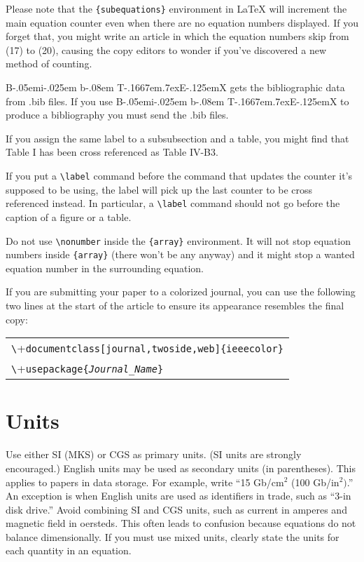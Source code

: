 \documentclass[journal,twoside,web]{ieeecolor}
\def\BibTeX{{\rm B\kern-.05em{\sc i\kern-.025em b}\kern-.08em
    T\kern-.1667em\lower.7ex\hbox{E}\kern-.125emX}}
\begin{document}
Please note that the \verb|{subequations}| environment in {\LaTeX}
will increment the main equation counter even when there are no
equation numbers displayed. If you forget that, you might write an
article in which the equation numbers skip from (17) to (20), causing
the copy editors to wonder if you've discovered a new method of
counting.

{\BibTeX} gets the bibliographic
data from .bib files. If you use {\BibTeX} to produce a
bibliography you must send the .bib files. 

If you assign the same label to a
subsubsection and a table, you might find that Table I has been cross
referenced as Table IV-B3. 

If you put a
\verb|\label| command before the command that updates the counter it's
supposed to be using, the label will pick up the last counter to be
cross referenced instead. In particular, a \verb|\label| command
should not go before the caption of a figure or a table.

Do not use \verb|\nonumber| inside the \verb|{array}| environment. It
will not stop equation numbers inside \verb|{array}| (there won't be
any anyway) and it might stop a wanted equation number in the
surrounding equation.

If you are submitting your paper to a colorized journal, you can use
the following two lines at the start of the article to ensure its
appearance resembles the final copy:

\smallskip\noindent
\begin{small}
\begin{tabular}{l}
\verb+\+\texttt{documentclass[journal,twoside,web]\{ieeecolor\}}\\
\verb+\+\texttt{usepackage\{\textit{Journal\_Name}\}}
\end{tabular}
\end{small}

\section{Units}
Use either SI (MKS) or CGS as primary units. (SI units are strongly 
encouraged.) English units may be used as secondary units (in parentheses). 
This applies to papers in data storage. For example, write ``15 
Gb/cm$^{2}$ (100 Gb/in$^{2})$.'' An exception is when 
English units are used as identifiers in trade, such as ``3\textonehalf-in 
disk drive.'' Avoid combining SI and CGS units, such as current in amperes 
and magnetic field in oersteds. This often leads to confusion because 
equations do not balance dimensionally. If you must use mixed units, clearly 
state the units for each quantity in an equation.
\end{document}
